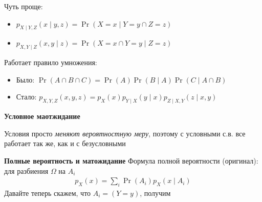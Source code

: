 \documentclass[12pt]{article}
\begin{document}
  
  Чуть проще:
  \begin{itemize}
    \item $p_{X \mid Y, Z}(x \mid y, z) = \Pr(X = x \mid Y = y \cap Z = z)$
    \item $p_{X, Y \mid Z}(x ,y \mid z) = \Pr(X = x \cap Y = y \mid Z = z)$
  \end{itemize}

  
  \vspace{1cm}
  Работает правило умножения:
  \begin{itemize}
    \item Было: $\Pr(A \cap B \cap C) = \Pr(A) \Pr(B \mid A) \Pr(C \mid A \cap B)$
    \item Стало: $p_{X, Y, Z}(x, y, z) = p_X(x) p_{Y \mid X}(y \mid x) p_{Z \mid X, Y}(z \mid x, y)$
  \end{itemize}




  \textbf{Условное маотжидание}

  \begin{center}
  \end{center}

  Условия просто \emph{меняют вероятностную меру}, поэтому с условными с.в. все работает так же, как и с безусловными



  \textbf{Полные вероятность и матожидание}
Формула полной вероятности (оригинал): для разбиения $\Omega$ на $A_i$
\begin{align*}
  p_X(x) = \sum_i \Pr(A_i) p_X(x \mid A_i) 
\end{align*}
 Давайте теперь скажем, что $A_i = (Y = y)$, получим
\begin{center}
\end{center}
\end{document}
